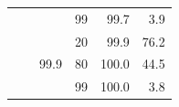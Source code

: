 \documentclass{article}
\begin{document}
\begin{table}
\begin{tabular}{|c|c|c|c|r|r|}
                                    &                                                                                        &                                                                                          & 99                                                                                      & 99.7                                                                      & 3.9                                                                       \\ \cline{3-6} 
                                    &                                                                                        & \multirow{3}{*}{99.9}                                                                    & 20                                                                                      & 99.9                                                                      & 76.2                                                                      \\ \cline{4-6} 
                                    &                                                                                        &                                                                                          & 80                                                                                      & 100.0                                                                     & 44.5                                                                      \\ \cline{4-6} 
                                    &                                                                                        &                                                                                          & 99                                                                                      & 100.0                                                                      & 3.8                                                                       \\ \hline
\end{tabular}
\label{resultados}
\end{table}
\end{document}
